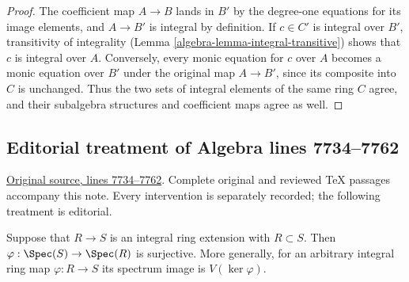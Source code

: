 \begin{proof}
The coefficient map $A\to B$ lands in $B'$ by the degree-one
equations for its image elements, and $A\to B'$ is integral by
definition. If $c\in C'$ is integral over $B'$, transitivity of
integrality (Lemma \ref{algebra-lemma-integral-transitive}) shows that $c$
is integral over $A$. Conversely, every monic equation for $c$
over $A$ becomes a monic equation over $B'$ under the original
map $A\to B'$, since its composite into $C$ is unchanged.
Thus the two sets of integral elements of the same ring $C$ agree,
and their subalgebra structures and coefficient maps agree as well.
\end{proof}


\subsection{Editorial treatment of Algebra lines 7734--7762}

\hypertarget{algebra-context-081}{}

\noindent\href{https://github.com/stacks/stacks-project/blob/a04446e57ec1fbc252a871afcec7752fb2807b14/algebra.tex\#L7734}{Original source, lines 7734--7762}. Complete original and reviewed TeX passages accompany this note. Every intervention is separately recorded; the following treatment is editorial.


\begin{lemma}
\label{editorial-source-lemma-integral-overring-surjective}
Suppose that $R \to S$ is an integral
ring extension with $R \subset S$.
Then $\varphi : \Spec(S) \to \Spec(R)$
is surjective. More generally, for an arbitrary integral ring map
$\varphi:R\to S$ its spectrum image is $V(\ker\varphi)$.
\end{lemma}

